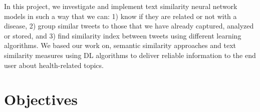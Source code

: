 \documentclass[12pt]{report}
\begin{document}
	
	

	
	
	In this project, we investigate and implement text similarity neural network models in such a way that we can: 1) know if they are related or not with a disease, 2) group similar tweets to those that we have already captured, analyzed or stored, and 3) find similarity index between tweets using different learning algorithms. We based our work on, semantic similarity approaches and text similarity measures using \ac{DL} algorithms to deliver reliable information to the end user about health-related topics.
	
	
	\section{Objectives}
	
\end{document}

